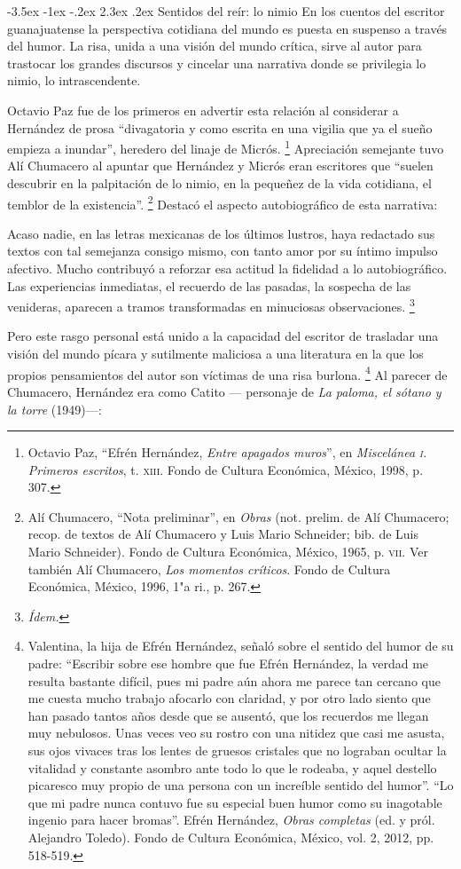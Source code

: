 \documentclass[14pt,twoside,final]{extbook} %
\makeatletter
\let\oldfootnote\footnote
\renewcommand\footnote[1]{%
\oldfootnote{\hspace{1mm}#1}}
\renewcommand\section{\@startsection {section}{1}{\z@}%
                                     {-3.5ex \@plus -1ex \@minus -.2ex}%
                                     {2.3ex \@plus .2ex}%
                                     {\normalfont\large\bfseries\sc}}
\makeatother
\begin{document}
\section{Sentidos del reír: lo nimio}\label{sec:sentidos-del-reir-lo-nimio}
En los cuentos del escritor guanajuatense la perspectiva cotidiana del mundo es puesta en suspenso a través del humor. La risa, unida a una visión del mundo crítica, sirve al autor para trastocar los grandes discursos y cincelar una narrativa donde se privilegia lo nimio, lo intrascendente.

Octavio Paz fue de los primeros en advertir esta relación al considerar a Hernández de prosa ``divagatoria y como escrita en una vigilia que ya el sueño empieza a inundar'', heredero del linaje de Micrós.\footnote{Octavio Paz, ``Efrén Hernández, \emph{Entre apagados muros}'', en \emph{Miscelánea \textsc{i}. Primeros escritos}, t. \textsc{xiii}. Fondo de Cultura Económica, México, 1998, p. 307.} Apreciación semejante tuvo Alí Chumacero al apuntar que Hernández y Micrós eran escritores que ``suelen descubrir en la palpitación de lo nimio, en la pequeñez de la vida cotidiana, el temblor de la existencia''.\footnote{Alí Chumacero, ``Nota preliminar'', en  \emph{Obras} (not. prelim. de Alí Chumacero; recop. de textos de Alí Chumacero y Luis Mario Schneider; bib. de Luis Mario Schneider). Fondo de Cultura Económica, México, 1965, p. \textsc{vii}. Ver también Alí Chumacero, \emph{Los momentos críticos}. Fondo de Cultura Económica, México, 1996, 1"a ri., p. 267.} Destacó el aspecto autobiográfico de esta narrativa:
\begin{quoting}
Acaso nadie, en las letras mexicanas de los últimos lustros, haya redactado sus textos con tal semejanza consigo mismo, con tanto amor por su íntimo impulso afectivo. Mucho contribuyó a reforzar esa actitud la fidelidad a lo autobiográfico. Las experiencias inmediatas, el recuerdo de las pasadas, la sospecha de las venideras, aparecen a tramos transformadas en minuciosas observaciones.\footnote{\em Ídem.}
\end{quoting}
Pero este rasgo personal está unido a la capacidad del escritor de trasladar una visión del mundo pícara y sutilmente maliciosa a una literatura en la que los propios pensamientos del autor son víctimas de una risa burlona.\footnote{Valentina, la hija de Efrén Hernández, señaló sobre el sentido del humor de su padre: ``Escribir sobre ese hombre que fue Efrén Hernández, la verdad me resulta bastante difícil, pues mi padre aún ahora me parece tan cercano que me cuesta mucho trabajo afocarlo con claridad, y por otro lado siento que han pasado tantos años desde que se ausentó, que los recuerdos me llegan muy nebulosos. Unas veces veo su rostro con una nitidez que casi me asusta, sus ojos vivaces tras los lentes de gruesos cristales que no lograban ocultar la vitalidad y constante asombro ante todo lo que le rodeaba, y aquel destello picaresco muy propio de una persona con un increíble sentido del humor''. ``Lo que mi padre nunca contuvo fue su especial buen humor como su inagotable ingenio para hacer bromas''. Efrén Hernández, \emph{Obras completas} (ed. y pról. Alejandro Toledo). Fondo de Cultura Económica, México, vol. 2, 2012, pp. 518-519.} Al parecer de Chumacero, Hernández era como Catito --- personaje de \emph{La paloma, el sótano y la torre} (1949)---:
\end{document}
